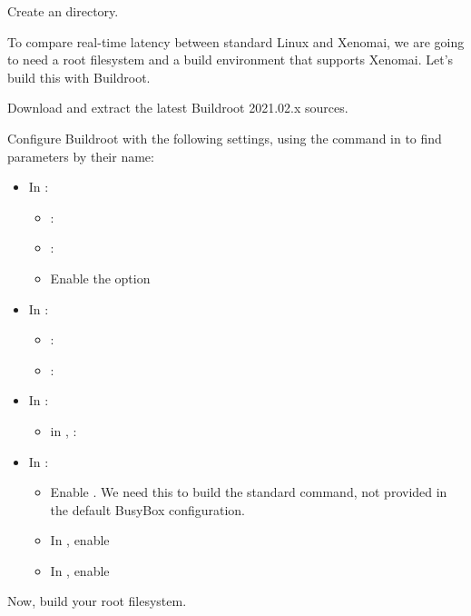 Create an  directory.

To compare real-time latency between standard Linux and Xenomai, we
are going to need a root filesystem and a build environment that
supports Xenomai. Let's build this with Buildroot.

Download and extract the latest Buildroot 2021.02.x sources.

Configure Buildroot with the following settings,
using the \code{/} command in  to find parameters by their name:

\begin{itemize}
\item In :
   \begin{itemize}
   \item {}: 
   \item {}: 
   \item Enable the  option
   \end{itemize}
\item In :
   \begin{itemize}
   \item {}: 
   \item {}: 
   \end{itemize}
\item In :
   \begin{itemize}
   \item in ,  : 
   \end{itemize}
\item In :
   \begin{itemize}
   \item Enable .
         We need this to build the standard  command, not
         provided in the default BusyBox configuration.
   \item In , enable 
   \item In , enable 
   \end{itemize}
\end{itemize}

Now, build your root filesystem.

